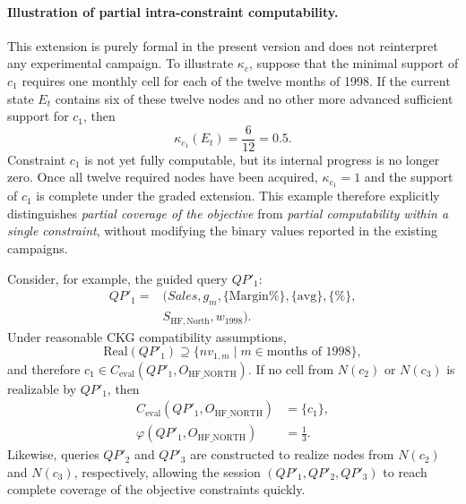 \paragraph*{Illustration of partial intra-constraint computability.}
This extension is purely formal in the present version and does not reinterpret any experimental campaign. To illustrate $\kappa_c$, suppose that the minimal support of $c_1$ requires one monthly cell for each of the twelve months of 1998. If the current state $E_t$ contains six of these twelve nodes and no other more advanced sufficient support for $c_1$, then
\[
\kappa_{c_1}(E_t)=\frac{6}{12}=0.5.
\]
Constraint $c_1$ is not yet fully computable, but its internal progress is no longer zero. Once all twelve required nodes have been acquired, $\kappa_{c_1}=1$ and the support of $c_1$ is complete under the graded extension. This example therefore explicitly distinguishes \emph{partial coverage of the objective} from \emph{partial computability within a single constraint}, without modifying the binary values reported in the existing campaigns.

Consider, for example, the guided query $QP'_1$:
\[
\begin{aligned}
QP'_1={}&(\textit{Sales},g_m,\{\mathrm{Margin\%}\},\{\mathrm{avg}\},\{\%\},\\
        &S_{\mathrm{HF,North}},w_{1998}).
\end{aligned}
\]
Under reasonable CKG compatibility assumptions,
\[
\mathrm{Real}(QP'_1)\supseteq \{nv_{1,m}\mid m\in \text{months of 1998}\},
\]
and therefore $c_1\in C_{\mathrm{eval}}(QP'_1,O_{\mathrm{HF\_NORTH}})$. If no cell from $N(c_2)$ or $N(c_3)$ is realizable by $QP'_1$, then
\[
\begin{aligned}
C_{\mathrm{eval}}(QP'_1,O_{\mathrm{HF\_NORTH}})&=\{c_1\},\\
\varphi(QP'_1,O_{\mathrm{HF\_NORTH}})&=\frac{1}{3}.
\end{aligned}
\]
Likewise, queries $QP'_2$ and $QP'_3$ are constructed to realize nodes from $N(c_2)$ and $N(c_3)$, respectively, allowing the session $(QP'_1,QP'_2,QP'_3)$ to reach complete coverage of the objective constraints quickly.

